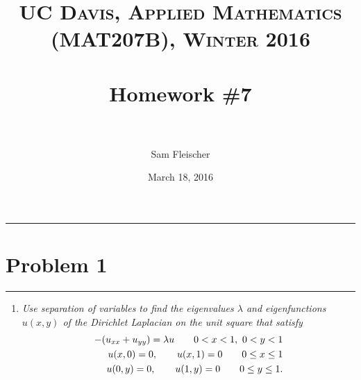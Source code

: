 \documentclass{article} %
\title{ 
\normalfont \normalsize 
\textsc{UC Davis, Applied Mathematics (MAT207B), Winter 2016} \\ [25pt] %
\horrule{2pt} \\[0.4cm] %
\Huge Homework \#7 \\ %
\horrule{2pt} \\[0.5cm] %
}
\author{\huge Sam Fleischer} %
\date{March 18, 2016} %
\theoremstyle{plain}
\newcommand{\problem}[1]{
\vspace{.375cm}
\begin{minipage}{\textwidth}
    \begin{center}
        \noindent\rule{5cm}{1pt}
    \end{center}
    \section{\bf #1}
    \begin{center}
        \noindent\rule{5cm}{1pt}
    \end{center}
    \vspace{0.25cm}
\end{minipage}
}
\begin{document}
\thispagestyle{empty}

\maketitle %

\makeatletter
{}
\makeatother

\pagebreak

\problem{Problem 1}
\begin{enumerate}[\it (a)]
    \item
        \emph{Use separation of variables to find the eigenvalues $\lambda$ and eigenfunctions $u(x,y)$ of the Dirichlet Laplacian on the unit square that satisfy}
        \begin{align*}
            -\qty(u_{xx} + u_{yy}) = \lambda u \qquad 0 < x < 1,\ 0 < y < 1 \\
            u(x,0) = 0,\qquad u(x,1) = 0 \qquad 0 \leq x \leq 1 \\
            u(0,y) = 0,\qquad u(1,y) = 0 \qquad 0 \leq y \leq 1.
        \end{align*}


\end{enumerate}
\end{document}
